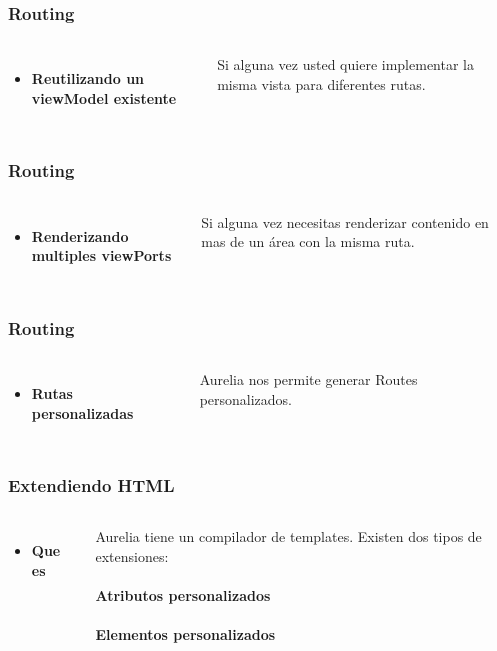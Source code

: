 \documentclass{beamer}
\begin{document}
\begin{frame}
\frametitle{Routing}
\begin{columns}[c]
\begin{itemize}
\item \textbf{Reutilizando un viewModel existente}
\end{itemize}
Si alguna vez usted quiere implementar la misma vista para diferentes rutas.
\end{columns}
\end{frame}
\begin{frame}
\frametitle{Routing}
\begin{columns}[c]
\begin{itemize}
\item \textbf{Renderizando multiples viewPorts}
\end{itemize}
Si alguna vez necesitas renderizar contenido en mas de un \'area con la misma ruta.
\end{columns}
\end{frame}
\begin{frame}
\frametitle{Routing}
\begin{columns}[c]
\begin{itemize}
\item \textbf{Rutas personalizadas}
\end{itemize}
Aurelia nos permite generar Routes personalizados.
\end{columns}
\end{frame}
\begin{frame}
\frametitle{Extendiendo HTML}
\begin{columns}[c]
\begin{itemize}
\item \textbf{Que es}
\end{itemize}
Aurelia tiene un compilador de templates. Existen dos tipos de extensiones:
\\~\\
\textbf{Atributos personalizados}
\\~\\
\textbf{Elementos personalizados}
\end{columns}
\end{frame}
\end{document}

